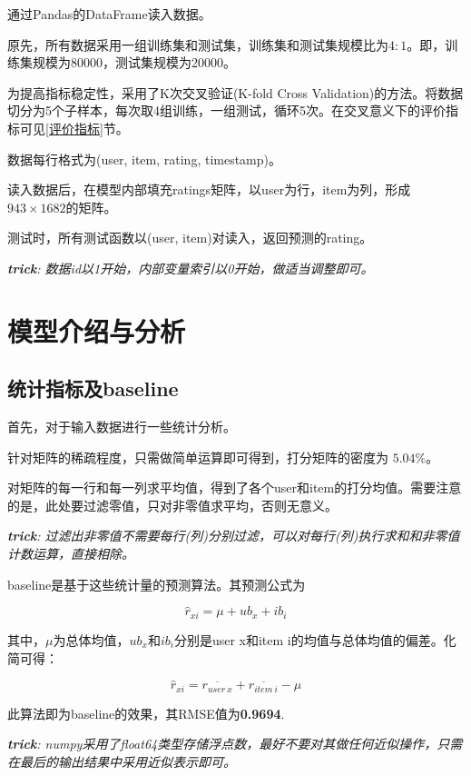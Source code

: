 \documentclass[utf8, a4paper,12pt, onecolumn]{ctexart}
\begin{document}
\begin{spacing}{1.3}
通过Pandas的DataFrame读入数据。

原先，所有数据采用一组训练集和测试集，训练集和测试集规模比为$4:1$。即，训练集规模为80000，测试集规模为20000。

为提高指标稳定性，采用了K次交叉验证(K-fold Cross Validation)的方法。将数据切分为5个子样本，每次取4组训练，一组测试，循环5次。在交叉意义下的评价指标可见\ref{评价指标}节。

数据每行格式为(user, item, rating, timestamp)。

读入数据后，在模型内部填充ratings矩阵，以user为行，item为列，形成$943 \times 1682$的矩阵。

测试时，所有测试函数以(user, item)对读入，返回预测的rating。

\textit{\textbf{trick}: 数据id以1开始，内部变量索引以0开始，做适当调整即可。}
\section{模型介绍与分析}

\subsection{统计指标及baseline}

首先，对于输入数据进行一些统计分析。

针对矩阵的稀疏程度，只需做简单运算即可得到，打分矩阵的密度为 $5.04\%$。

对矩阵的每一行和每一列求平均值，得到了各个user和item的打分均值。需要注意的是，此处要过滤零值，只对非零值求平均，否则无意义。

\textit{\textbf{trick}: 过滤出非零值不需要每行(列)分别过滤，可以对每行(列)执行求和和非零值计数运算，直接相除。}

baseline是基于这些统计量的预测算法。其预测公式为

\[\hat{r}_{xi} = \mu + ub_{x} + ib_{i}\]

其中，$\mu$为总体均值，$ub_{x}$和$ib_{i}$分别是user x和item i的均值与总体均值的偏差。化简可得：

\[\hat{r}_{xi} = \overline{r_{user\ x}}+ \overline{r_{item\ i}} - \mu\]

此算法即为baseline的效果，其RMSE值为\textbf{0.9694}.

\textit{\textbf{trick}: numpy采用了float64类型存储浮点数，最好不要对其做任何近似操作，只需在最后的输出结果中采用近似表示即可。}



\end{spacing}
\end{document}
